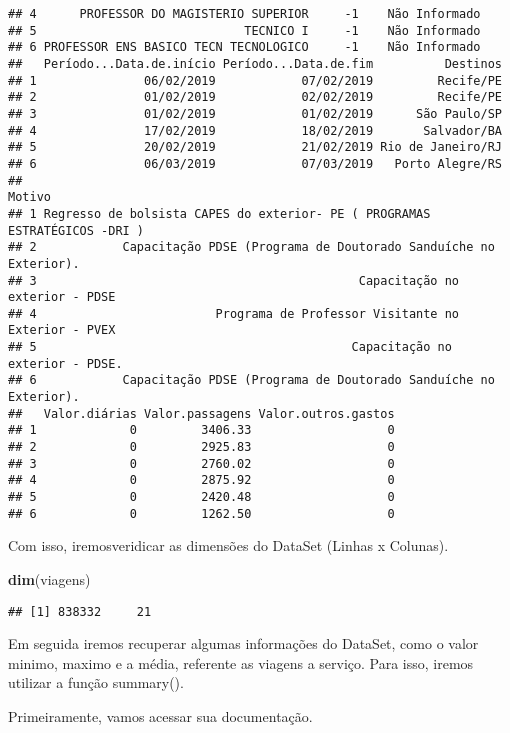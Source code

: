 \documentclass[
]{article}
\newenvironment{Shaded}{\begin{snugshade}}{\end{snugshade}}
\newcommand{\KeywordTok}[1]{\textcolor[rgb]{0.13,0.29,0.53}{\textbf{#1}}}
\newcommand{\NormalTok}[1]{#1}
\begin{document}
\begin{verbatim}
## 4      PROFESSOR DO MAGISTERIO SUPERIOR     -1    Não Informado
## 5                             TECNICO I     -1    Não Informado
## 6 PROFESSOR ENS BASICO TECN TECNOLOGICO     -1    Não Informado
##   Período...Data.de.início Período...Data.de.fim          Destinos
## 1               06/02/2019            07/02/2019         Recife/PE
## 2               01/02/2019            02/02/2019         Recife/PE
## 3               01/02/2019            01/02/2019      São Paulo/SP
## 4               17/02/2019            18/02/2019       Salvador/BA
## 5               20/02/2019            21/02/2019 Rio de Janeiro/RJ
## 6               06/03/2019            07/03/2019   Porto Alegre/RS
##                                                                       Motivo
## 1 Regresso de bolsista CAPES do exterior- PE ( PROGRAMAS ESTRATÉGICOS -DRI )
## 2            Capacitação PDSE (Programa de Doutorado Sanduíche no Exterior).
## 3                                             Capacitação no exterior - PDSE
## 4                         Programa de Professor Visitante no Exterior - PVEX
## 5                                            Capacitação no exterior - PDSE.
## 6            Capacitação PDSE (Programa de Doutorado Sanduíche no Exterior).
##   Valor.diárias Valor.passagens Valor.outros.gastos
## 1             0         3406.33                   0
## 2             0         2925.83                   0
## 3             0         2760.02                   0
## 4             0         2875.92                   0
## 5             0         2420.48                   0
## 6             0         1262.50                   0
\end{verbatim}

Com isso, iremosveridicar as dimensões do DataSet (Linhas x Colunas).

\begin{Shaded}
\begin{Highlighting}[]
\KeywordTok{dim}\NormalTok{(viagens)}
\end{Highlighting}
\end{Shaded}

\begin{verbatim}
## [1] 838332     21
\end{verbatim}

Em seguida iremos recuperar algumas informações do DataSet, como o valor
minimo, maximo e a média, referente as viagens a serviço. Para isso,
iremos utilizar a função summary().

Primeiramente, vamos acessar sua documentação.
\end{document}
